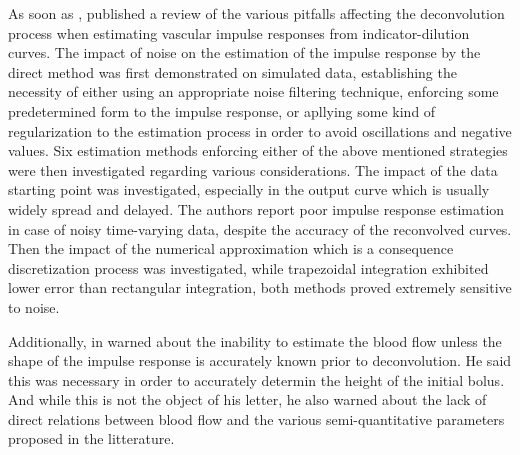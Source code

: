 As soon as \citeyear{Gamel:1973uz}, \citet{Gamel:1973uz} published a review of the various pitfalls affecting the deconvolution process when estimating vascular impulse responses from indicator-dilution curves. 
The impact of noise on the estimation of the impulse response by the direct method was first demonstrated on simulated data, establishing the necessity of either using an appropriate noise filtering technique, enforcing some predetermined form to the impulse response, or apllying some kind of regularization to the estimation process in order to avoid oscillations and negative values.
Six estimation methods enforcing either of the above mentioned strategies were then investigated regarding various considerations.
The impact of the data starting point was investigated, especially in the output curve which is usually widely spread and delayed.
The authors report poor impulse response estimation in case of noisy time-varying data, despite the accuracy of the reconvolved curves.
Then the impact of the numerical approximation which is a consequence discretization process was investigated, while trapezoidal integration exhibited lower error than rectangular integration, both methods proved extremely sensitive to noise. 

Additionally, in \citeyear{Lassen:1984kp} \citet{Lassen:1984kp} warned about the inability to estimate the blood flow unless the shape of the impulse response is accurately known prior to deconvolution.
He said this was necessary in order to accurately determin the height of the initial bolus.
And while this is not the object of his letter, he also warned about the lack of direct relations between blood flow and the various semi-quantitative parameters proposed in the litterature.

